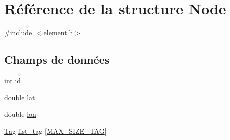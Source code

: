 \hypertarget{struct_node}{\section{Référence de la structure Node}
\label{struct_node}
}


{\ttfamily \#include $<$element.\-h$>$}

\subsection*{Champs de données}
\begin{DoxyCompactItemize}
\item 
int \hyperlink{struct_node_a59a543130a10c95f1e8642cf8c5645e8_a59a543130a10c95f1e8642cf8c5645e8}{id}
\item 
double \hyperlink{struct_node_a854dbe1c0bcdc8553f4d542236bedc8a_a854dbe1c0bcdc8553f4d542236bedc8a}{lat}
\item 
double \hyperlink{struct_node_a9c37e3bd5e3cf7d58097d4723ac90014_a9c37e3bd5e3cf7d58097d4723ac90014}{lon}
\item 
\hyperlink{struct_tag}{Tag} \hyperlink{struct_node_ae94ee4024db0558e0b988b2be638951b_ae94ee4024db0558e0b988b2be638951b}{list\-\_\-tag} \mbox{[}\hyperlink{constante_8h_ac5e9843814463e2ce3fa687df8a75fe7_ac5e9843814463e2ce3fa687df8a75fe7}{M\-A\-X\-\_\-\-S\-I\-Z\-E\-\_\-\-T\-A\-G}\mbox{]}
\end{DoxyCompactItemize}


